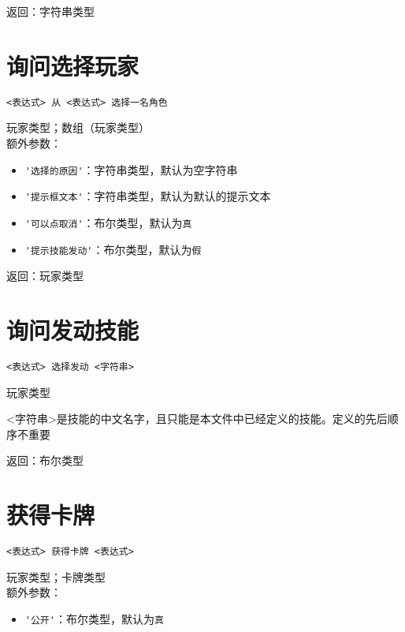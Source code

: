 返回：字符串类型

\section{询问选择玩家}

\begin{verbatim}
<表达式> 从 <表达式> 选择一名角色
\end{verbatim}

玩家类型；数组（玩家类型） \\

额外参数：

\begin{itemize}
  \item \verb|'选择的原因'|：字符串类型，默认为空字符串
  \item \verb|'提示框文本'|：字符串类型，默认为默认的提示文本
  \item \verb|'可以点取消'|：布尔类型，默认为\verb|真|
  \item \verb|'提示技能发动'|：布尔类型，默认为\verb|假|
\end{itemize}

返回：玩家类型

\section{询问发动技能}

\begin{verbatim}
<表达式> 选择发动 <字符串>
\end{verbatim}

玩家类型

<字符串>是技能的中文名字，且只能是本文件中已经定义的技能。定义的先后顺序不重要

返回：布尔类型

\section{获得卡牌}

\begin{verbatim}
<表达式> 获得卡牌 <表达式>
\end{verbatim}

玩家类型；卡牌类型 \\

额外参数：

\begin{itemize}
  \item \verb|'公开'|：布尔类型，默认为\verb|真|
\end{itemize}

